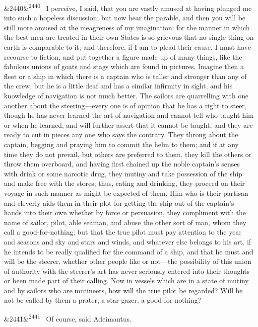 \documentclass[12pt]{article}
\newcommand{\para}[1][]{\par\noindent\ifx&#1&\else\textsuperscript{\footnotesize #1}~\fi}
\begin{document}
\para[2440] I perceive, I said, that you are vastly amused at having plunged me into such a hopeless discussion; but now hear the parable, and then you will be still more amused at the meagreness of my imagination: for the manner in which the best men are treated in their own States is so grievous that no single thing on earth is comparable to it; and therefore, if I am to plead their cause, I must have recourse to fiction, and put together a figure made up of many things, like the fabulous unions of goats and stags which are found in pictures. Imagine then a fleet or a ship in which there is a captain who is taller and stronger than any of the crew, but he is a little deaf and has a similar infirmity in sight, and his knowledge of navigation is not much better. The sailors are quarrelling with one another about the steering---every one is of opinion that he has a right to steer, though he has never learned the art of navigation and cannot tell who taught him or when he learned, and will further assert that it cannot be taught, and they are ready to cut in pieces any one who says the contrary. They throng about the captain, begging and praying him to commit the helm to them; and if at any time they do not prevail, but others are preferred to them, they kill the others or throw them overboard, and having first chained up the noble captain's senses with drink or some narcotic drug, they mutiny and take possession of the ship and make free with the stores; thus, eating and drinking, they proceed on their voyage in such manner as might be expected of them. Him who is their partisan and cleverly aids them in their plot for getting the ship out of the captain's hands into their own whether by force or persuasion, they compliment with the name of sailor, pilot, able seaman, and abuse the other sort of man, whom they call a good-for-nothing; but that the true pilot must pay attention to the year and seasons and sky and stars and winds, and whatever else belongs to his art, if he intends to be really qualified for the command of a ship, and that he must and will be the steerer, whether other people like or not---the possibility of this union of authority with the steerer's art has never seriously entered into their thoughts or been made part of their calling. Now in vessels which are in a state of mutiny and by sailors who are mutineers, how will the true pilot be regarded? Will he not be called by them a prater, a star-gazer, a good-for-nothing?

\para[2441] Of course, said Adeimantus.
\end{document}
